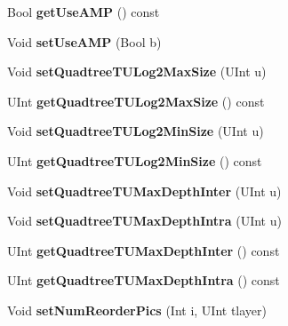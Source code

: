 \begin{DoxyCompactItemize}
\item 
\mbox{\label{class_t_com_s_p_s_a7e131a4be122b35a75940734b9677aed}} 
Bool {\bfseries get\+Use\+A\+MP} () const
\item 
\mbox{\label{class_t_com_s_p_s_a0aee9f3ef8f2a2457275237912feeef1}} 
Void {\bfseries set\+Use\+A\+MP} (Bool b)
\item 
\mbox{\label{class_t_com_s_p_s_a6ebf88306790e9f6b05ad9411ea4a43e}} 
Void {\bfseries set\+Quadtree\+T\+U\+Log2\+Max\+Size} (U\+Int u)
\item 
\mbox{\label{class_t_com_s_p_s_a882b6c2e283e69e7d040d79ffbc5fc74}} 
U\+Int {\bfseries get\+Quadtree\+T\+U\+Log2\+Max\+Size} () const
\item 
\mbox{\label{class_t_com_s_p_s_a9e2e5d96bb7918241feb00605f6fddfd}} 
Void {\bfseries set\+Quadtree\+T\+U\+Log2\+Min\+Size} (U\+Int u)
\item 
\mbox{\label{class_t_com_s_p_s_a0b0beac7e706cb8b78f6a6d868bc254a}} 
U\+Int {\bfseries get\+Quadtree\+T\+U\+Log2\+Min\+Size} () const
\item 
\mbox{\label{class_t_com_s_p_s_aa1cdc22a11c315b2457e38bd69962f9b}} 
Void {\bfseries set\+Quadtree\+T\+U\+Max\+Depth\+Inter} (U\+Int u)
\item 
\mbox{\label{class_t_com_s_p_s_a67d872d72ef626a2407711fcbb5505f6}} 
Void {\bfseries set\+Quadtree\+T\+U\+Max\+Depth\+Intra} (U\+Int u)
\item 
\mbox{\label{class_t_com_s_p_s_a57d5f1b02d319335a9ff39b0df5001ac}} 
U\+Int {\bfseries get\+Quadtree\+T\+U\+Max\+Depth\+Inter} () const
\item 
\mbox{\label{class_t_com_s_p_s_a1e1b4bf1d7c02990c3a3d0acb42d36a7}} 
U\+Int {\bfseries get\+Quadtree\+T\+U\+Max\+Depth\+Intra} () const
\item 
\mbox{\label{class_t_com_s_p_s_ace738fe86afd184e0ced7b5306fb9585}} 
Void {\bfseries set\+Num\+Reorder\+Pics} (Int i, U\+Int tlayer)

\end{DoxyCompactItemize}
